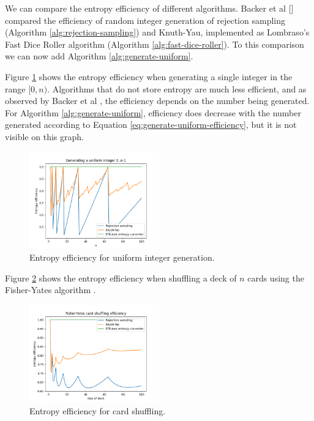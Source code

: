 \documentclass[12pt]{article}
\begin{document}
We can compare the entropy efficiency of different algorithms. Backer et al [] compared the efficiency of random integer generation of rejection sampling (Algorithm \ref{alg:rejection-sampling}) and Knuth-Yau, implemented as Lombraso's Fast Dice Roller algorithm (Algorithm \ref{alg:fast-dice-roller}). To this comparison we can now add Algorithm \ref{alg:generate-uniform}.

Figure \ref{fig:uniform} shows the entropy efficiency when generating a single integer in the range $[0,n)$.  Algorithms that do not store entropy are much less efficient, and as observed by Backer et al \cite{todo}, the efficiency depends on the number being generated. For Algorithm \ref{alg:generate-uniform}, efficiency does decrease with the number generated according to Equation \ref{eq:generate-uniform-efficiency}, but it is not visible on this graph.

\begin{figure}[ht]
\centering
\includegraphics[width=0.5\textwidth]{uniform_efficiency.png}
\caption{Entropy efficiency for uniform integer generation.}
\label{fig:uniform}
\end{figure}

Figure \ref{fig:shuffle} shows the entropy efficiency when shuffling a deck of $n$ cards using the Fisher-Yates algorithm \cite{fisher-yates}.

\begin{figure}[ht]
\centering
\includegraphics[width=0.5\textwidth]{shuffling_efficiency.png}
\caption{Entropy efficiency for card shuffling.}
\label{fig:shuffle}
\end{figure}
\end{document}
